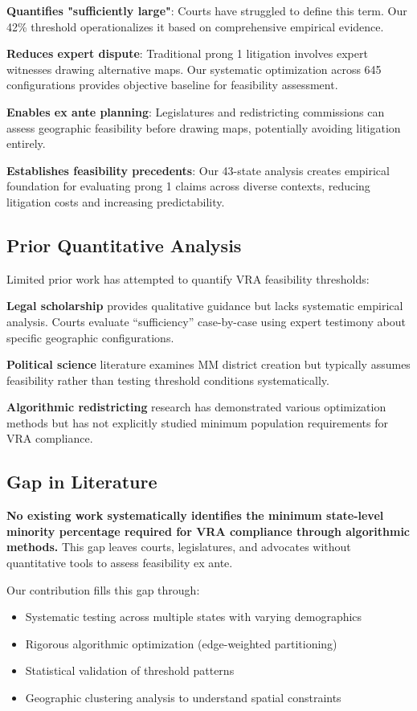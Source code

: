 \textbf{Quantifies "sufficiently large"}: Courts have struggled to define this term. Our 42\% threshold operationalizes it based on comprehensive empirical evidence.

\textbf{Reduces expert dispute}: Traditional prong 1 litigation involves expert witnesses drawing alternative maps. Our systematic optimization across 645 configurations provides objective baseline for feasibility assessment.

\textbf{Enables ex ante planning}: Legislatures and redistricting commissions can assess geographic feasibility before drawing maps, potentially avoiding litigation entirely.

\textbf{Establishes feasibility precedents}: Our 43-state analysis creates empirical foundation for evaluating prong 1 claims across diverse contexts, reducing litigation costs and increasing predictability.

\subsection{Prior Quantitative Analysis}

Limited prior work has attempted to quantify VRA feasibility thresholds:

\textbf{Legal scholarship} provides qualitative guidance but lacks systematic empirical analysis. Courts evaluate ``sufficiency'' case-by-case using expert testimony about specific geographic configurations.

\textbf{Political science} literature examines MM district creation but typically assumes feasibility rather than testing threshold conditions systematically.

\textbf{Algorithmic redistricting} research has demonstrated various optimization methods but has not explicitly studied minimum population requirements for VRA compliance.

\subsection{Gap in Literature}

\textbf{No existing work systematically identifies the minimum state-level minority percentage required for VRA compliance through algorithmic methods.} This gap leaves courts, legislatures, and advocates without quantitative tools to assess feasibility ex ante.

Our contribution fills this gap through:
\begin{itemize}
    \item Systematic testing across multiple states with varying demographics
    \item Rigorous algorithmic optimization (edge-weighted partitioning)
    \item Statistical validation of threshold patterns
    \item Geographic clustering analysis to understand spatial constraints
\end{itemize}


